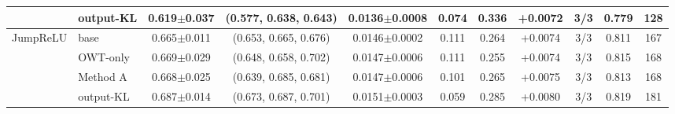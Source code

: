 \begin{table}[t]
\begin{adjustbox}{max width=\linewidth}
\begin{tabular}{llccccccccc}
 & output-KL & 0.619$\pm$0.037 & (0.577, 0.638, 0.643) & 0.0136$\pm$0.0008 & 0.074 & 0.336 & +0.0072 & 3/3 & 0.779 & 128 \\
\midrule
JumpReLU & base & 0.665$\pm$0.011 & (0.653, 0.665, 0.676) & 0.0146$\pm$0.0002 & 0.111 & 0.264 & +0.0074 & 3/3 & 0.811 & 167 \\
 & OWT-only & 0.669$\pm$0.029 & (0.648, 0.658, 0.702) & 0.0147$\pm$0.0006 & 0.111 & 0.255 & +0.0074 & 3/3 & 0.815 & 168 \\
 & Method A & 0.668$\pm$0.025 & (0.639, 0.685, 0.681) & 0.0147$\pm$0.0006 & 0.101 & 0.265 & +0.0075 & 3/3 & 0.813 & 168 \\
 & output-KL & 0.687$\pm$0.014 & (0.673, 0.687, 0.701) & 0.0151$\pm$0.0003 & 0.059 & 0.285 & +0.0080 & 3/3 & 0.819 & 181 \\
\bottomrule
\end{tabular}
\end{adjustbox}
\end{table}
